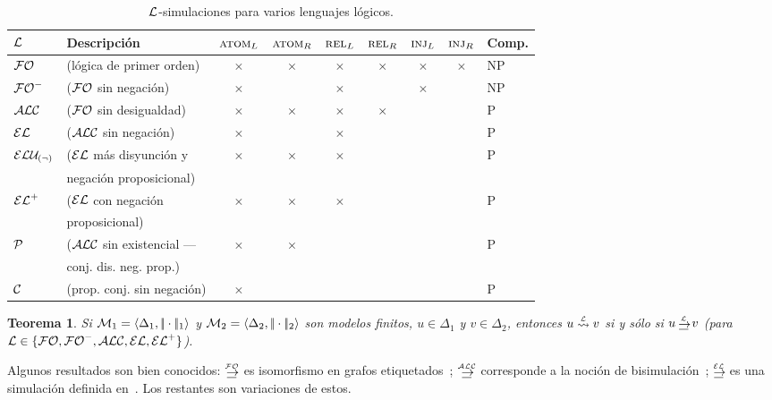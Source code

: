 \begin{table}[t]

\begin{tabular}{|l|l|cccccc|l|}
\hline
  $\mathcal{L}$ & Descripci\'on &$\textsc{atom}_L$ & $\textsc{atom}_R$ & $\textsc{rel}_L$ & $\textsc{rel}_R$ & $\textsc{inj}_L\space$ & $\textsc{inj}_R\space$ & Comp.\\
  \hline
  $\mathcal{FO}$ & (l\'ogica de primer orden)  & $\times$ & $\times$ & $\times$ & $\times$ & $\times$ & $\times$ & NP\\ \hline
  ${\mathcal{FO}^-}$ & ($\mathcal{FO}$ sin negaci\'on) & $\times$ & & $\times$ && $\times$ & & NP\\ \hline 
  $\mathcal{ALC}$   & ($\mathcal{FO}$ sin desigualdad) & $\times$ & $\times$ & $\times$ & $\times$&& & P\\ \hline
  $\mathcal{EL}$   & ($\mathcal{ALC}$ sin negaci\'on) & $\times$ & &  $\times$ & & & &P\\ \hline
	$\mathcal{ELU_{(\neg)} }$ & ($\mathcal{EL}$ m\'as disyunci\'on y  & $\times$ & $\times$ &  $\times$ & & & &P\\ 
	&negaci\'on proposicional)&&&&&&&\\ \hline
  ${\mathcal{EL}^+}$ & ($\mathcal{EL}$ con negaci\'on & $\times$ & $\times$ &  $\times$ & & & &P\\ 
	&proposicional) &&&&&&& \\ \hline
	$\mathcal{P}$ & ($\mathcal{ALC}$ sin existencial --- & $\times$ & $\times$ & & & & &P\\ 
	&conj. dis. neg. prop.)&&&&&&&\\ \hline
	$\mathcal{C}$ & (prop. conj. sin negaci\'on)& $\times$ &  &  & & & &P\\ 
	
\hline	
\end{tabular}

\caption{$\mathcal{L}$-simulaciones para varios lenguajes l\'ogicos.}\label{tab:simuls}
\end{table}

\newtheorem{teorema}{Teorema}
\begin{teorema} \label{thm:simulation}
Si  $\mathcal{M}_1 = \langle \Delta_1, |\!|\cdot|\!|_1 \rangle$ y $\mathcal{M}_2 =
\langle \Delta_2, |\!|\cdot|\!|_2 \rangle$ son modelos finitos, $u \in
\Delta_1$ y $v \in \Delta_2$, entonces $u \simil{\+L} v$ si y s\'olo si $u
\simul{\+L} v$ (para $\mathcal{L} \in \{\mathcal{FO},{\mathcal{FO}^-},\mathcal{ALC},\mathcal{EL},{\mathcal{EL}^+}\}$).
\end{teorema}
Algunos resultados son bien conocidos: $\simul{\FOL}$ es isomorfismo en
grafos etiquetados~\cite{ebbi:math96}; $\simul{\ALC}$ corresponde a la
noci\'on de bisimulaci\'on~\cite[Def.~2.16]{BRV01}; $\simul{\EL}$ es una
simulaci\'on definida en~\cite[Def.~2.77]{BRV01}. Los restantes son variaciones de estos.

